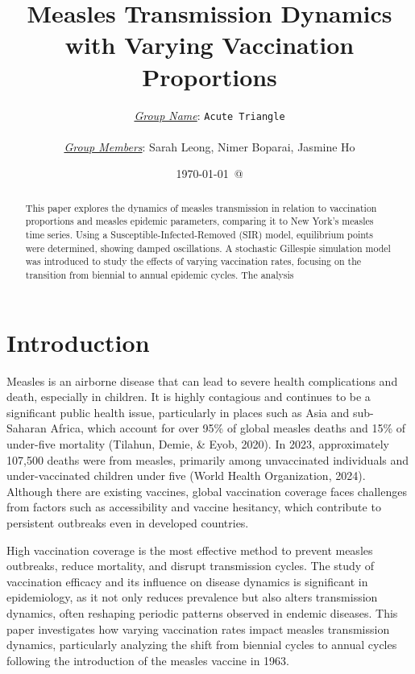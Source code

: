 \documentclass[12pt]{article}
\title{Measles Transmission Dynamics with Varying Vaccination Proportions}
\author{\underline{\emph{Group Name}}: \texttt{{\color{blue}Acute Triangle}}\\
{}\\
\underline{\emph{Group Members}}: {\color{blue}Sarah Leong, Nimer Boparai, Jasmine Ho}}
\date{\today\ @ \thistime}
\begin{document}
\maketitle


\begin{abstract}
This paper explores the dynamics of measles transmission in relation to vaccination proportions and measles epidemic parameters, comparing it to New York's measles time series. Using a Susceptible-Infected-Removed (SIR) model, equilibrium points were determined, showing damped oscillations. A stochastic Gillespie simulation model was introduced to study the effects of varying vaccination rates, focusing on the transition from biennial to annual epidemic cycles. The analysis
\end{abstract}

\tableofcontents

\section{Introduction}


\indent Measles is an airborne disease that can lead to severe health complications and death, especially in children. It is highly contagious and continues to be a significant public health issue, particularly in places such as Asia and sub-Saharan Africa, which account for over 95\% of global measles deaths and 15\% of under-five mortality (Tilahun, Demie, \& Eyob, 2020). In 2023, approximately 107,500 deaths were from measles, primarily among unvaccinated individuals and under-vaccinated children under five (World Health Organization, 2024). Although there are existing vaccines, global vaccination coverage faces challenges from factors such as accessibility and vaccine hesitancy, which contribute to persistent outbreaks even in developed countries.

\indent High vaccination coverage is the most effective method to prevent measles outbreaks, reduce mortality, and disrupt transmission cycles. The study of vaccination efficacy and its influence on disease dynamics is significant in epidemiology, as it not only reduces prevalence but also alters transmission dynamics, often reshaping periodic patterns observed in endemic diseases. This paper investigates how varying vaccination rates impact measles transmission dynamics, particularly analyzing the shift from biennial cycles to annual cycles following the introduction of the measles vaccine in 1963.
\end{document}
